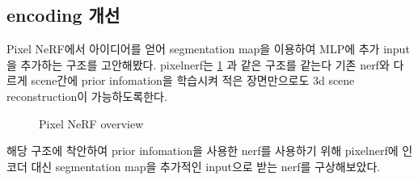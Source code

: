 \documentclass{vipweekly}
\begin{document}
\newpage


\subsection{encoding 개선}

Pixel NeRF\cite{pixelnerf}에서 아이디어를 얻어 segmentation map을 이용하여 MLP에 추가 input을 추가하는 구조를 고안해봤다.
pixelnerf는 \ref{fig:pixelnerf} 과 같은 구조를 같는다 기존 nerf와 다르게 scene간에 prior infomation을 학습시켜
적은 장면만으로도 3d scene reconstruction이 가능하도록한다. 

\newpage


\begin{figure}[h]
    \centering
    \hfill
    \hfill
    \caption{Pixel NeRF overview}
    \label{fig:pixelnerf}
\end{figure}

해당 구조에 착안하여 prior infomation을 사용한 nerf를 사용하기 위해 
pixelnerf에 인코더 대신 segmentation map을 추가적인 input으로 받는 nerf를 구상해보았다.
\end{document}
